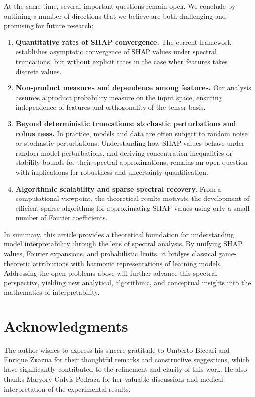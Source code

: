\documentclass[letterpaper,11pt]{article}
\numberwithin{equation}{section}
\numberwithin{equation}{section}
\begin{document}
At the same time, several important questions remain open. We conclude by outlining a number of directions that we believe are both challenging and promising for future research:
\begin{enumerate}
    \item {\bf Quantitative rates of SHAP convergence.} The current framework establishes asymptotic convergence of SHAP values under spectral truncations, but without explicit rates in the case when features takes discrete values.
    \item {\bf Non-product measures and dependence among features.} Our analysis assumes a product probability measure on the input space, ensuring independence of features and orthogonality of the tensor basis.
    \item {\bf Beyond deterministic truncations: stochastic perturbations and robustness.} In practice, models and data are often subject to random noise or stochastic perturbations. Understanding how SHAP values behave under random model perturbations, and deriving concentration inequalities or stability bounds for their spectral approximations, remains an open question with implications for robustness and uncertainty quantification.
    \item {\bf Algorithmic scalability and sparse spectral recovery.} From a computational viewpoint, the theoretical results motivate the development of efficient sparse algorithms for approximating SHAP values using only a small number of Fourier coefficients. %
\end{enumerate}
In summary, this article provides a theoretical foundation for understanding model interpretability through the lens of spectral analysis. By unifying SHAP values, Fourier expansions, and probabilistic limits, it bridges classical game-theoretic attributions with harmonic representations of learning models. Addressing the open problems above will further advance this spectral perspective, yielding new analytical, algorithmic, and conceptual insights into the mathematics of interpretability. 

\section*{Acknowledgments}
The author wishes to express his sincere gratitude to Umberto Biccari and Enrique Zuazua for their thoughtful remarks and constructive suggestions, which have significantly contributed to the refinement and clarity of this work. He also thanks Maryory Galvis Pedraza for her valuable discussions and medical interpretation of the experimental results.
\end{document}
